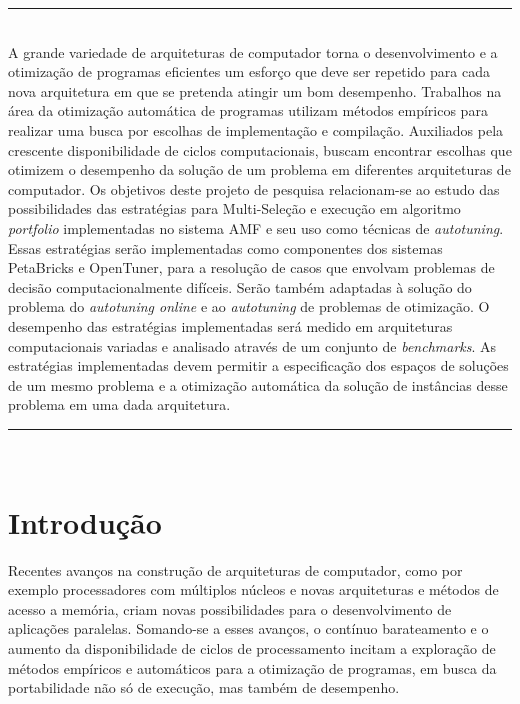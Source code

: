 \documentclass[a4paper, 12pt]{article}
\begin{document}
\abstract
\noindent
\rule{\linewidth}{.1mm} \\
\noindent
A grande variedade de arquiteturas de computador torna o desenvolvimento e a 
otimização de programas eficientes um esforço que deve ser repetido para cada 
nova arquitetura em que se pretenda atingir um bom desempenho.
Trabalhos na área da otimização automática de programas utilizam métodos 
empíricos para realizar uma busca por escolhas de implementação e compilação.
Auxiliados pela crescente disponibilidade de ciclos computacionais,
buscam encontrar escolhas que otimizem o desempenho da solução de um problema
em diferentes arquiteturas de computador. Os objetivos deste projeto de 
pesquisa relacionam-se ao estudo das possibilidades das estratégias para 
Multi-Seleção e execução em algoritmo \emph{portfolio} implementadas no sistema
AMF e seu uso como técnicas de \emph{autotuning}.
Essas estratégias serão implementadas como componentes dos sistemas PetaBricks
e OpenTuner, para a resolução de casos que envolvam problemas de decisão 
computacionalmente difíceis. 
Serão também adaptadas à solução do problema do \emph{autotuning online} e ao 
\emph{autotuning} de problemas de otimização.
O desempenho das estratégias implementadas será medido em arquiteturas 
computacionais variadas e analisado através de um conjunto de 
\emph{benchmarks}. As estratégias implementadas devem permitir a especificação
dos espaços de soluções de um mesmo problema e a otimização automática da 
solução de instâncias desse problema em uma dada arquitetura.

\noindent
\rule{\linewidth}{.1mm} \\

\tableofcontents

\newpage

\section{Introdução} \label{sec:intro}

Recentes avanços na construção de arquiteturas de computador, como
por exemplo processadores com múltiplos núcleos e novas arquiteturas
e métodos de acesso a memória, criam novas possibilidades para o 
desenvolvimento de aplicações paralelas. Somando-se a esses avanços, o contínuo
barateamento e o aumento da disponibilidade de ciclos de processamento incitam 
a exploração de métodos empíricos e automáticos para a otimização de programas,
em busca da portabilidade não só de execução, mas também de desempenho. 
\end{document}
